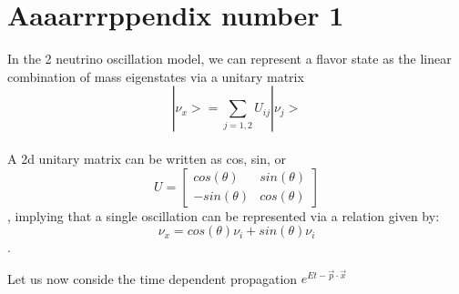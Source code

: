\documentclass[12pt]{article}
\begin{document}
\appendix
\section{Aaaarrrppendix number 1}
In the 2 neutrino oscillation model, we can represent a flavor state as the linear combination of mass eigenstates via a unitary matrix
\begin{equation}
|\nu_x> = \sum_{j=1,2} U_{ij} |\nu_j>  
\end{equation}
\\ A 2d unitary matrix can be written as cos, sin, or
\begin{equation}
U = \begin{bmatrix}
cos(\theta) & sin(\theta)
\\ -sin(\theta)& cos(\theta)
\end{bmatrix}
\end{equation},
implying that a single oscillation can be represented via a relation given by:
\begin{equation}
\nu_x = cos(\theta)\nu_i + sin(\theta)\nu_i 
\end{equation}.

Let us now conside the time dependent propagation 
$e^{Et - \vec{p}\cdot\vec{x}}$
\end{document}
